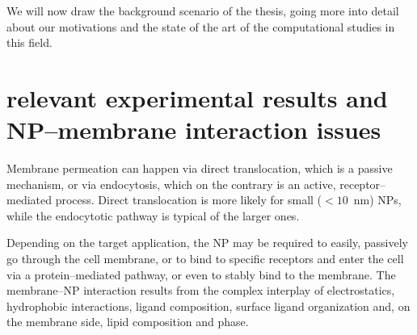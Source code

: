 We will now draw the background scenario of the thesis, going more into detail about our motivations and the state of the art of the computational studies in this field.

\section{relevant experimental results and NP--membrane interaction issues}
Membrane permeation can happen via direct translocation, which is a passive mechanism, or via endocytosis, which on the contrary is an active, receptor--mediated process. Direct translocation is more likely for small ($< 10$~nm) \acp{NP}, while the endocytotic pathway is typical of the larger ones.

Depending on the target application, the \ac{NP} may be required to easily, passively go through the cell membrane, or to bind to specific receptors and enter the cell via a protein--mediated pathway, or even to stably bind to the membrane. The membrane--\ac{NP} interaction results from the complex interplay of electrostatics, hydrophobic interactions, ligand composition, surface ligand organization and, on the membrane side, lipid composition and phase.

